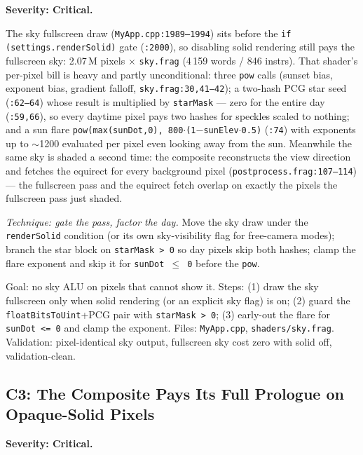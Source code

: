 \documentclass[11pt,a4paper]{article}
\begin{document}
\textbf{Severity: Critical.}

The sky fullscreen draw (\texttt{MyApp.cpp:1989--1994}) sits before the
\texttt{if (settings.renderSolid)} gate (\texttt{:2000}), so disabling solid
rendering still pays the fullscreen sky: 2.07\,M pixels $\times$
\texttt{sky.frag} (4\,159 words / 846 instrs). That shader's per-pixel bill
is heavy and partly unconditional: three \texttt{pow} calls (sunset bias,
exponent bias, gradient falloff, \texttt{sky.frag:30,41--42}); a two-hash
PCG star seed (\texttt{:62--64}) whose result is multiplied by
\texttt{starMask} --- zero for the entire day (\texttt{:59,66}), so every
daytime pixel pays two hashes for speckles scaled to nothing; and a sun
flare \texttt{pow(max(sunDot,0), 800$\cdot$(1$-$sunElev$\cdot$0.5)}
(\texttt{:74}) with exponents up to $\sim$1200 evaluated per pixel even
looking away from the sun. Meanwhile the same sky is shaded a second time:
the composite reconstructs the view direction and fetches the equirect for
every background pixel (\texttt{postprocess.frag:107--114}) --- the
fullscreen pass and the equirect fetch overlap on exactly the pixels the
fullscreen pass just shaded.

\textit{Technique: gate the pass, factor the day.} Move the sky draw under
the \texttt{renderSolid} condition (or its own sky-visibility flag for
free-camera modes); branch the star block on \texttt{starMask > 0} so day
pixels skip both hashes; clamp the flare exponent and skip it for
\texttt{sunDot $\le$ 0} before the \texttt{pow}.

\begin{tcolorbox}[promptbox={Prompt --- C2: conditional sky fullscreen, day-factored stars}]
Goal: no sky ALU on pixels that cannot show it. Steps: (1) draw the sky
fullscreen only when solid rendering (or an explicit sky flag) is on;
(2) guard the \texttt{floatBitsToUint}+PCG pair with \texttt{starMask > 0};
(3) early-out the flare for \texttt{sunDot <= 0} and clamp the exponent.
Files: \texttt{MyApp.cpp}, \texttt{shaders/sky.frag}. Validation:
pixel-identical sky output, fullscreen sky cost zero with solid off,
validation-clean.
\end{tcolorbox}

\subsection{C3: The Composite Pays Its Full Prologue on Opaque-Solid Pixels}
\label{sec:c3}

\textbf{Severity: Critical.}
\end{document}
